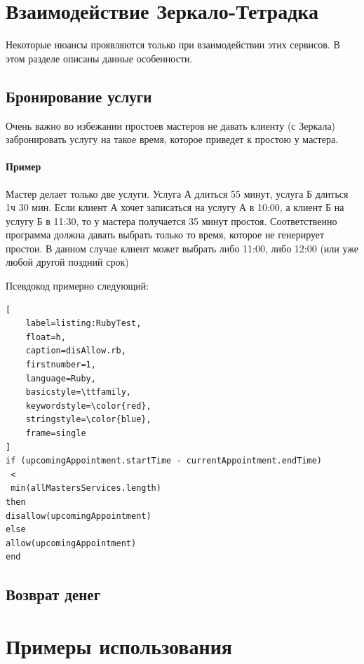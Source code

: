 \documentclass[DIV=calc, paper=a4, fontsize=11pt]{scrartcl} %
\begin{document}
\section{Взаимодействие Зеркало-Тетрадка}

Некоторые нюансы проявляются только при взаимодействии этих сервисов. В этом разделе описаны данные особенности.

\subsection{Бронирование услуги}

Очень важно во избежании простоев мастеров не давать клиенту (с Зеркала) забронировать услугу на такое время, которое приведет к простою у мастера. 

\begin{framed}
	\paragraph{Пример} Мастер делает только две услуги. Услуга А длиться 55 минут, услуга Б длиться 1ч 30 мин. Если клиент А хочет записаться на услугу А в 10:00, а клиент Б на услугу Б в 11:30, то у мастера получается 35 минут простоя. Соответственно программа должна давать выбрать только то время, которое не генерирует простои. В данном случае клиент может выбрать либо 11:00, либо 12:00 (или уже любой другой поздний срок)	
\end{framed}

Псевдокод примерно следующий:	

\begin{lstlisting}[
    label=listing:RubyTest,
    float=h,
    caption=disAllow.rb,
    firstnumber=1,
    language=Ruby,
    basicstyle=\ttfamily,
    keywordstyle=\color{red},
    stringstyle=\color{blue},
    frame=single
]
if (upcomingAppointment.startTime - currentAppointment.endTime)
 < 
 min(allMastersServices.length)
then
disallow(upcomingAppointment)
else
allow(upcomingAppointment)
end
\end{lstlisting}

\subsection{Возврат денег} \label{subsection:money_return}

\section{Примеры использования}
\end{document}
